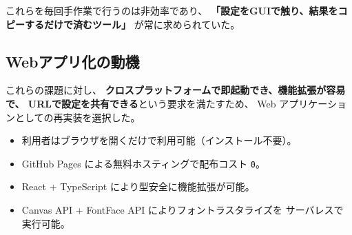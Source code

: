 これらを毎回手作業で行うのは非効率であり、
\textbf{「設定をGUIで触り、結果をコピーするだけで済むツール」}
が常に求められていた。

\subsection{Webアプリ化の動機}

これらの課題に対し、
\textbf{クロスプラットフォームで即起動でき、機能拡張が容易で、
URLで設定を共有できる}という要求を満たすため、
Web アプリケーションとしての再実装を選択した。

\begin{itemize}[leftmargin=*,itemsep=2pt]
  \item 利用者はブラウザを開くだけで利用可能（インストール不要）。
  \item GitHub Pages による無料ホスティングで配布コスト \texttt{0}。
  \item React + TypeScript により型安全に機能拡張が可能。
  \item Canvas API + FontFace API によりフォントラスタライズを
        サーバレスで実行可能。
\end{itemize}

\newpage

